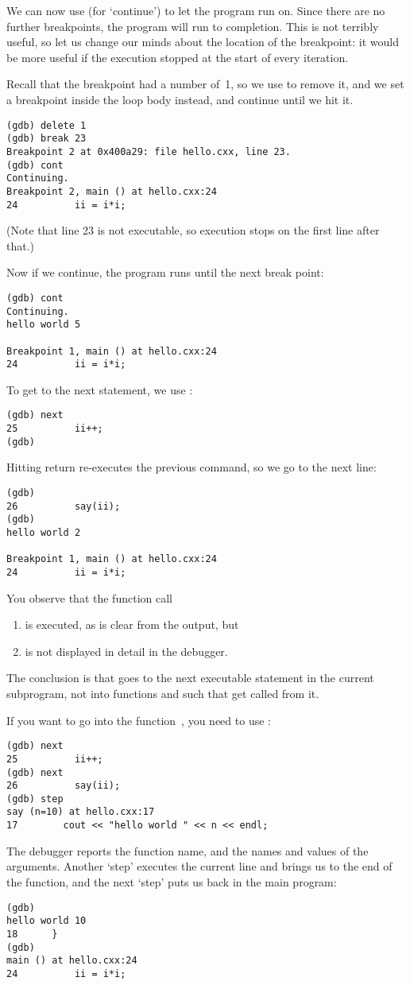 We can now use  (for `continue') to let the program run on.
Since there are no further breakpoints, the program will run to completion.
This is not terribly useful, so let us change our minds about the location of the breakpoint:
it would be more useful if the execution stopped at the start of every iteration.

Recall that the breakpoint had a number of~1, so we use  to remove it,
and we set a breakpoint inside the loop body instead,
and continue until we hit it.
\begin{lstlisting}
(gdb) delete 1
(gdb) break 23
Breakpoint 2 at 0x400a29: file hello.cxx, line 23.
(gdb) cont
Continuing.
Breakpoint 2, main () at hello.cxx:24
24          ii = i*i;
\end{lstlisting}
(Note that line 23 is not executable, so execution stops on the first line after that.)

Now if we continue, the program runs until the next break point:
\begin{lstlisting}
(gdb) cont
Continuing.
hello world 5

Breakpoint 1, main () at hello.cxx:24
24          ii = i*i;
\end{lstlisting}

To get to the next statement, we use :
\begin{verbatim}
(gdb) next
25          ii++;
(gdb)
\end{verbatim}

Hitting return re-executes the previous command,
so we go to the next line:
\begin{verbatim}
(gdb)
26          say(ii);
(gdb)
hello world 2

Breakpoint 1, main () at hello.cxx:24
24          ii = i*i;
\end{verbatim}

You observe that the function call
\begin{enumerate}
\item is executed, as is clear from the  output, but
\item is not displayed in detail in the debugger.
\end{enumerate}
The conclusion is that  goes to the next executable statement
in the current subprogram, not into functions and such that get called from it.

If you want to go into the function~, you need to use :
\begin{verbatim}
(gdb) next
25          ii++;
(gdb) next
26          say(ii);
(gdb) step
say (n=10) at hello.cxx:17
17        cout << "hello world " << n << endl;
\end{verbatim}
The debugger reports the function name, and the names and values of the arguments.
Another `step' executes the current line and brings us to the end of the function,
and the next `step' puts us back in the main program:
\begin{verbatim}
(gdb)
hello world 10
18      }
(gdb)
main () at hello.cxx:24
24          ii = i*i;
\end{verbatim}

